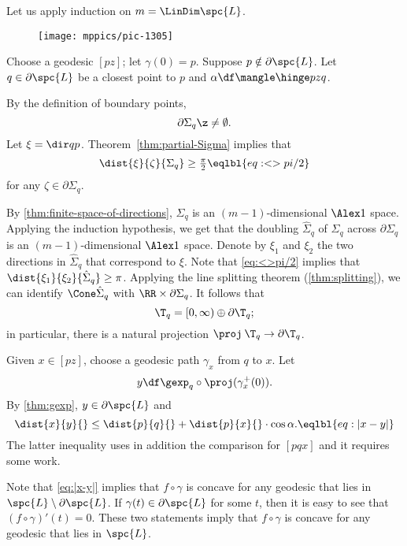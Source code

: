 

Let us apply induction on $m=\LinDim \spc{L}$.

\begin{wrapfigure}{r}{30mm}
\vskip-2mm
\centering
\texttt{[image: mppics/pic-1305]}
\end{wrapfigure}

Choose a geodesic $[pz]$; let $\gamma(0)=p$.
Suppose $p\notin\partial \spc{L}$.
Let $q\in \partial\spc{L}$ be a closest point to $p$ and $\alpha\df\mangle\hinge pzq$.

By the definition of boundary points, 
\[\partial \Sigma_q\z\ne\emptyset.\]
Let $\xi=\dir qp$.
Theorem~\ref{thm:partial-Sigma} implies that 
\[\dist{\xi}{\zeta}{\Sigma_q}\ge \tfrac\pi2
\eqlbl{eq:<>pi/2}\]
for any $\zeta\in\partial\Sigma_q$.

By \ref{thm:finite-space-of-directions}, $\Sigma_q$ is an $(m-1)$-dimensional $\Alex1$ space.
Applying the induction hypothesis, we get that the doubling $\hat\Sigma_q$ of $\Sigma_q$ across $\partial \Sigma_q$ is an $(m-1)$-dimensional $\Alex1$ space.
Denote by $\xi_1$ and $\xi_2$ the two directions in $\hat\Sigma_q$ that correspond to $\xi$.
Note that \ref{eq:<>pi/2} implies that $\dist{\xi_1}{\xi_2}{\hat\Sigma_q}\ge \pi$.
Applying the line splitting theorem (\ref{thm:splitting}), we can identify 
$\Cone\hat\Sigma_q$ with $\RR\times \partial\Sigma_q$.
It follows that 
\[\T_q=[0,\infty)\oplus \partial\T_q;\]
in particular, there is a natural projection $\proj\:\T_q\to \partial\T_q$.

Given $x\in [pz]$, choose a geodesic path $\gamma_x$ from $q$ to $x$.
Let 
\[y
\df
\gexp_q\circ\proj(\gamma^+_x(0)).\]
By \ref{thm:gexp}, $y\in \partial\spc{L}$ and 
\[\dist{x}{y}{}\le \dist{p}{q}{}+\dist{p}{x}{}\cdot \cos\alpha.\eqlbl{eq:|x-y|}\]
The latter inequality uses in addition the comparison for $[pqx]$ and it requires some work.

Note that \ref{eq:|x-y|} implies that $f\circ\gamma$ is concave for any geodesic that lies in $\spc{L}\setminus \partial \spc{L}$.
If $\gamma(t)\in \partial \spc{L}$ for some $t$, then it is easy to see that $(f\circ\gamma)'(t)=0$.
These two statements imply that $f\circ\gamma$ is concave for any geodesic that lies in $\spc{L}$.
















